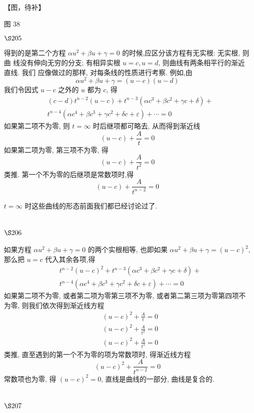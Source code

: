 【图，待补】

图 38

$\S 205$

得到的是第二个方程 $\alpha u^{2}+\beta u+\gamma=0$ 的时候,应区分该方程有无实根: 无实根, 则曲 线没有伸向无穷的分支; 有相异实根 $u=c, u=d$, 则曲线有两条相平行的渐近直线. 我们 应像做过的那样, 对每条线的性质进行考察. 例如,由
\[
\alpha u^{2}+\beta u+\gamma=(u-c)(u-d)
\]
我们令因式 $u-c$ 之外的 $u$ 都为 $c$, 得
\[
\begin{aligned}
& (c-d) t^{n-2}(u-c)+t^{n-3}\left(\alpha c^{3}+\beta c^{2}+\gamma c+\delta\right)+ \\
& t^{n-4}\left(\alpha c^{4}+\beta c^{3}+\gamma c^{2}+\delta c+\varepsilon\right)+\cdots=0
\end{aligned}
\]
如果第二项不为零, 则 $t=\infty$ 时后继项都可略去, 从而得到渐近线
\[
(u-c)+\frac{A}{t}=0
\]
如果第二项为零, 第三项不为零, 得
\[
(u-c)+\frac{A}{t^{2}}=0
\]
类推. 第一个不为零的后继项是常数项时,得
\[
(u-c)+\frac{A}{t^{n-2}}=0
\]

$t=\infty$ 时这些曲线的形态前面我们都已经讨论过了.

\section{$\S 206$}

如果方程 $\alpha u^{2}+\beta u+\gamma=0$ 的两个实根相等, 也即如果 $\alpha u^{2}+\beta u+\gamma=(u-c)^{2}$, 那么把 $u=c$ 代入其余各项,得
\[
\begin{aligned}
& t^{n-2}(u-c)^{2}+t^{n-3}\left(\alpha c^{3}+\beta c^{2}+\gamma c+\delta\right)+ \\
& t^{n-4}\left(\alpha c^{4}+\beta c^{3}+\gamma c^{2}+\delta c+\varepsilon\right)+\cdots=0
\end{aligned}
\]
如果第二项不为零, 或者第二项为零第三项不为零, 或者第二第三项为零第四项不为零, 则我们依次得到渐近线方程
\[
\begin{aligned}
& (u-c)^{2}+\frac{A}{t}=0 \\
& (u-c)^{2}+\frac{A}{t^{2}}=0 \\
& (u-c)^{2}+\frac{A}{t^{3}}=0
\end{aligned}
\]
类推, 直至遇到的第一个不为零的项为常数项时, 得渐近线方程
\[
(u-c)^{2}+\frac{A}{t^{n-2}}=0
\]
常数项也为零, 得 $(u-c)^{2}=0$, 直线是曲线的一部分, 曲线是复合的.

\section{$\S 207$}


